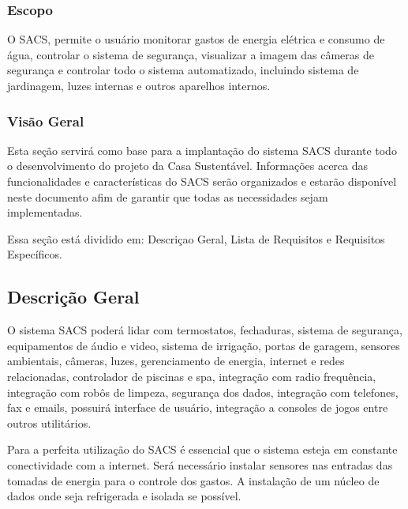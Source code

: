 \subsubsection{Escopo}

	O SACS, permite o usuário monitorar gastos de energia elétrica e consumo de água, controlar o sistema de segurança,
	visualizar a imagem das câmeras de segurança e controlar todo o sistema automatizado, incluindo sistema de
	jardinagem, luzes internas e outros aparelhos internos.

\subsubsection{Visão Geral}

	Esta seção servirá como base para a implantação do sistema SACS durante todo o desenvolvimento do projeto da Casa
	 Sustentável. Informações acerca das funcionalidades e características do SACS serão organizados e estarão
	 disponível neste documento afim de garantir que todas as necessidades sejam implementadas.

	Essa seção está dividido em: Descriçao Geral, Lista de Requisitos e Requisitos Específicos.

\subsection{Descrição Geral}

	O sistema SACS poderá lidar com termostatos, fechaduras, sistema de segurança, equipamentos de áudio e video, sistema
	de irrigação, portas de garagem, sensores ambientais, câmeras, luzes, gerenciamento de energia, internet e
	redes relacionadas, controlador de piscinas e spa, integração com radio frequência, integração com robôs de
	limpeza, segurança dos dados, integração com telefones, fax e emails, possuirá interface de usuário, integração
	 a consoles de jogos entre outros utilitários.

	Para a perfeita utilização do SACS é essencial que o sistema esteja em constante conectividade com a internet.
	Será necessário instalar sensores nas entradas das tomadas de energia para o controle dos gastos. A instalação
	de um núcleo de dados onde seja refrigerada e isolada se possível.

